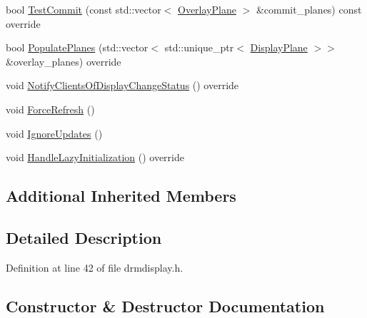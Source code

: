 \begin{DoxyCompactItemize}
\item 
bool \mbox{\hyperlink{classhwcomposer_1_1DrmDisplay_a7aaa318ce853a36ebcaf837fe1801f88}{Test\+Commit}} (const std\+::vector$<$ \mbox{\hyperlink{structhwcomposer_1_1OverlayPlane}{Overlay\+Plane}} $>$ \&commit\+\_\+planes) const override
\item 
bool \mbox{\hyperlink{classhwcomposer_1_1DrmDisplay_acbf817afffc6ad6f2879d914a0335dd0}{Populate\+Planes}} (std\+::vector$<$ std\+::unique\+\_\+ptr$<$ \mbox{\hyperlink{classhwcomposer_1_1DisplayPlane}{Display\+Plane}} $>$$>$ \&overlay\+\_\+planes) override
\item 
void \mbox{\hyperlink{classhwcomposer_1_1DrmDisplay_af4cf9ce1ea43e3520506dfc75c751c1f}{Notify\+Clients\+Of\+Display\+Change\+Status}} () override
\item 
void \mbox{\hyperlink{classhwcomposer_1_1DrmDisplay_a787d5eac9ba60ad9ae6f51cb028e8790}{Force\+Refresh}} ()
\item 
void \mbox{\hyperlink{classhwcomposer_1_1DrmDisplay_a0ac8713e1c6c26d0721295c8c6277540}{Ignore\+Updates}} ()
\item 
void \mbox{\hyperlink{classhwcomposer_1_1DrmDisplay_a7dd459cd835df8ff956350d3b53628e8}{Handle\+Lazy\+Initialization}} () override
\end{DoxyCompactItemize}
\subsection*{Additional Inherited Members}


\subsection{Detailed Description}


Definition at line 42 of file drmdisplay.\+h.



\subsection{Constructor \& Destructor Documentation}
\mbox{\label{classhwcomposer_1_1DrmDisplay_af465e6d3c061a21372fcc2c1da960e79}} 
